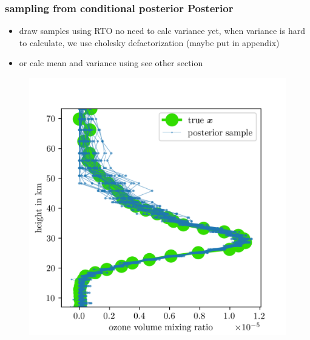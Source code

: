 \subsubsection{sampling from conditional posterior Posterior}
\begin{itemize}
	\item draw samples using RTO no need to calc variance yet, when variance is hard to calculate, we use cholesky defactorization (maybe put in appendix)
	\item or calc mean and variance using see other section
\end{itemize}
\begin{figure}[ht!]
	\centering
	\includegraphics{FirstTestRes.png}
	\caption[]{}
	\label{fig:}
\end{figure}


